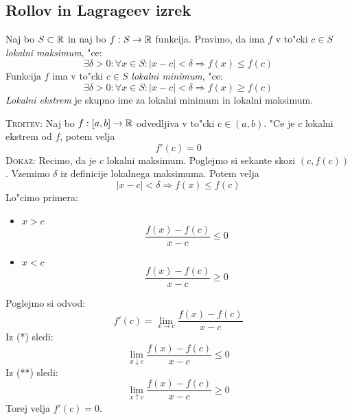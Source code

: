 \subsection{Rollov in Lagrageev izrek}
 Naj bo $S \subset \mathbb{R}$ in naj bo $f: S \to \mathbb{R}$ funkcija. Pravimo, da ima $f$ v to"cki $c \in S$ \emph{lokalni maksimum}, "ce:
\begin{equation*}
\exists \delta > 0: \forall x \in S: |x - c| < \delta \Rightarrow f(x) \leq f(c)
\end{equation*}
Funkcija $f$ ima v to"cki $c \in S$ \emph{lokalni minimum}, "ce:
\begin{equation*}
\exists \delta > 0: \forall x \in S: |x - c| < \delta \Rightarrow f(x) \geq f(c)
\end{equation*}
\emph{Lokalni ekstrem} je skupno ime za lokalni minimum in lokalni maksimum.

\textsc{Trditev:} Naj bo $f: [a, b] \to \mathbb{R}$ odvedljiva v to"cki $c \in (a, b)$. "Ce je $c$ lokalni ekstrem od $f$, potem velja
\begin{equation*}
f'(c) = 0
\end{equation*}
\textsc{Dokaz:} Recimo, da je $c$ lokalni maksimum. Poglejmo si sekante skozi $(c, f(c))$. Vzemimo $\delta$ iz definicije lokalnega maksimuma. Potem velja
\begin{equation*}
|x - c| < \delta \Rightarrow f(x) \leq f(c)
\end{equation*}
Lo"cimo primera:
\begin{itemize}
	\item $x > c$
	\begin{equation*}
	\dfrac{f(x) - f(c)}{x - c} \leq 0 \tag{*}
	\end{equation*}
	
	\item $x < c$
	\begin{equation*}
	\dfrac{f(x) - f(c)}{x - c} \geq 0 \tag{**}
	\end{equation*}
\end{itemize}
Poglejmo si odvod:
\begin{equation*}
f'(c) = \lim_{x \to c} \dfrac{f(x) - f(c)}{x - c}
\end{equation*}
Iz (*) sledi:
\begin{equation*}
\lim_{x \downarrow c} \dfrac{f(x) - f(c)}{x - c} \leq 0
\end{equation*}
Iz (**) sledi:
\begin{equation*}
\lim_{x \uparrow c} \dfrac{f(x) - f(c)}{x - c} \geq 0
\end{equation*}
Torej velja $f'(c) = 0$.

